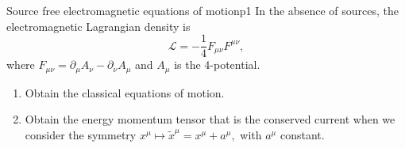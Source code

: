 \begin{problem}{Source free electromagnetic equations of motion}{p1}
    In the absence of sources, the electromagnetic Lagrangian density is
    \begin{equation*}
       \mathcal{L} = -\frac14 F_{\mu\nu}F^{\mu\nu},
    \end{equation*}
    where \(F_{\mu\nu} = \partial_\mu A_\nu - \partial_\nu A_\mu\) and \(A_\mu\) is the 4-potential.
    \begin{enumerate}[label=(\alph*)]
        \item Obtain the classical equations of motion.
        \item Obtain the energy momentum tensor that is the conserved current when we consider the symmetry \(x^\mu \mapsto \tilde{x}^\mu = x^\mu + a^\mu,\) with \(a^\mu\) constant.
    \end{enumerate}
\end{problem}
